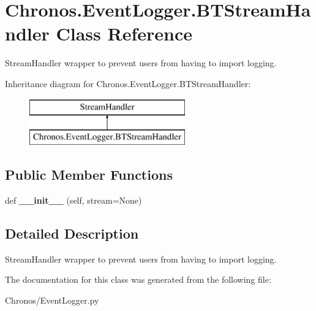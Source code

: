 \hypertarget{classChronos_1_1EventLogger_1_1BTStreamHandler}{}\section{Chronos.\+Event\+Logger.\+B\+T\+Stream\+Handler Class Reference}
\label{classChronos_1_1EventLogger_1_1BTStreamHandler}


Stream\+Handler wrapper to prevent users from having to import logging.  


Inheritance diagram for Chronos.\+Event\+Logger.\+B\+T\+Stream\+Handler\+:\begin{figure}[H]
\begin{center}
\leavevmode
\includegraphics[height=2.000000cm]{classChronos_1_1EventLogger_1_1BTStreamHandler}
\end{center}
\end{figure}
\subsection*{Public Member Functions}
\begin{DoxyCompactItemize}
\item 
def {\bfseries \+\_\+\+\_\+init\+\_\+\+\_\+} (self, stream=None)
\end{DoxyCompactItemize}


\subsection{Detailed Description}
Stream\+Handler wrapper to prevent users from having to import logging. 

The documentation for this class was generated from the following file\+:\begin{DoxyCompactItemize}
\item 
Chronos/Event\+Logger.\+py\end{DoxyCompactItemize}
